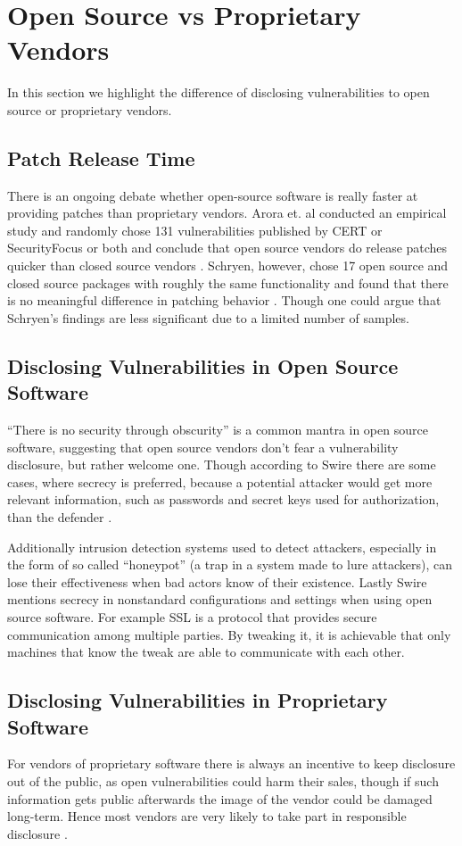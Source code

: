 \section{Open Source vs Proprietary Vendors}
\label{sec:open_vs_prop}
In this section we highlight the difference of disclosing vulnerabilities to open source or proprietary vendors.

\subsection{Patch Release Time}

There is an ongoing debate whether open-source software is really faster at providing patches than proprietary vendors. Arora et. al conducted an empirical study and randomly chose 131 vulnerabilities published by CERT or SecurityFocus or both and conclude that open source vendors do release patches quicker than closed source vendors \cite{Arora10_Patch_Release}. Schryen, however, chose 17 open source and closed source packages with roughly the same functionality and found that there is no meaningful difference in patching behavior \cite{Schryen2011}. Though one could argue that Schryen's findings are less significant due to a limited number of samples.

\subsection{Disclosing Vulnerabilities in Open Source Software}

``There is no security through obscurity'' is a common mantra in open source software, suggesting that open source vendors don't fear a vulnerability disclosure, but rather welcome one. Though according to Swire there are some cases, where secrecy is preferred, because a potential attacker would get more relevant information, such as passwords and secret keys used for authorization, than the defender \cite{Swire06TheoryOfDisclosure}.

Additionally intrusion detection systems used to detect attackers, especially in the form of so called ``honeypot'' (a trap in a system made to lure attackers), can lose their effectiveness when bad actors know of their existence.
Lastly Swire mentions secrecy in nonstandard configurations and settings when using open source software. For example SSL is a protocol that provides secure communication among multiple parties. By tweaking it, it is achievable that only machines that know the tweak are able to communicate with each other.

\subsection{Disclosing Vulnerabilities in Proprietary Software}

For vendors of proprietary software there is always an incentive to keep disclosure out of the public, as open vulnerabilities could harm their sales, though if such information gets public afterwards the image of the vendor could be damaged long-term. Hence most vendors are very likely to take part in responsible disclosure \cite{Swire06TheoryOfDisclosure}.